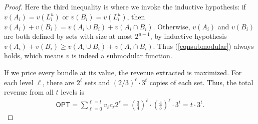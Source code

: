 \begin{proof}
Here the third inequality is where we invoke the inductive hypothesis: if $v(A_i)=v(L_i^u)$ or $v(B_i)=v(L_i^u)$, then $v(A_i)+v(B_i)=v(A_i\cup B_i)+v(A_i\cap B_i)$. Otherwise, $v(A_i)$ and $v(B_i)$ are both defined by sets with size at most $2^{u-1}$, by inductive hypothesis $v(A_i)+v(B_i)\geq v(A_i\cup B_i)+v(A_i\cap B_i)$. Thus (\ref{eqnsubmodular}) always holds, which means $v$ is indeed a submodular function.

If we price every bundle at its value, the revenue extracted is maximized. For each level $\ell$, there are $2^{\ell}$ sets and $(2/3)^{\ell} \cdot 3^{t}$ copies of each set. Thus, the total revenue from all $t$ levels is
\begin{align*}
	\textsf{OPT} = \sum_{\ell = 0}^{\ell = t} v_\ell c_\ell 2^\ell = \left( \frac{3}{4} \right)^{\ell}  \cdot \left( \frac{4}{3} \right)^{\ell} \cdot  3^{t} = t \cdot 3^{t}.
\end{align*}





\end{proof}
